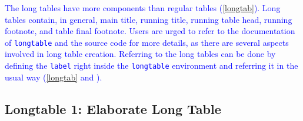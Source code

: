 \documentclass[phd]{ndsu-thesis-2022}
\newcommand\italk[1]{\textcolor{blue}{#1}}  %
\newcommand\vb[1]{\textcolor{blue}{\texttt{#1}}}%
\begin{document}
\italk{The long tables have more components than regular tables (\cref{longtab}). Long tables contain, in general, main title, running title, running table head, running footnote, and table final footnote. Users are urged to refer to the documentation of \vb{longtable} and the source code for more details, as there are several aspects involved in long table creation. Referring to the long tables can be done by defining the \texttt{label} right inside the \texttt{longtable} environment and referring it in the usual way (\cref{longtab} and \Cref{longtab}).}

\subsection{Longtable 1: Elaborate Long Table}
\vspace{2ex}
\setlength\LTleft{0pt}
\setlength\LTright{0pt}
\end{document}
